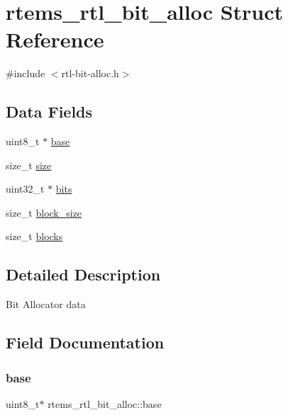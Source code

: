 \hypertarget{structrtems__rtl__bit__alloc}{}\section{rtems\+\_\+rtl\+\_\+bit\+\_\+alloc Struct Reference}
\label{structrtems__rtl__bit__alloc}


{\ttfamily \#include $<$rtl-\/bit-\/alloc.\+h$>$}

\subsection*{Data Fields}
\begin{DoxyCompactItemize}
\item 
uint8\+\_\+t $\ast$ \mbox{\hyperlink{structrtems__rtl__bit__alloc_a1b7bcd9ab30ccf4846352eb314de8826}{base}}
\item 
size\+\_\+t \mbox{\hyperlink{structrtems__rtl__bit__alloc_af29cf9ce897a9b15378daf92444957e9}{size}}
\item 
uint32\+\_\+t $\ast$ \mbox{\hyperlink{structrtems__rtl__bit__alloc_a553723c705da84d0805ec11281171759}{bits}}
\item 
size\+\_\+t \mbox{\hyperlink{structrtems__rtl__bit__alloc_a91a6949ffc363f15707bc32d99a439f1}{block\+\_\+size}}
\item 
size\+\_\+t \mbox{\hyperlink{structrtems__rtl__bit__alloc_a95cebbedbf66f80d3a9862b9dc1a1a60}{blocks}}
\end{DoxyCompactItemize}


\subsection{Detailed Description}
Bit Allocator data 

\subsection{Field Documentation}
\mbox{\label{structrtems__rtl__bit__alloc_a1b7bcd9ab30ccf4846352eb314de8826}} 
\subsubsection{\texorpdfstring{base}{base}}
{\footnotesize\ttfamily uint8\+\_\+t$\ast$ rtems\+\_\+rtl\+\_\+bit\+\_\+alloc\+::base}

